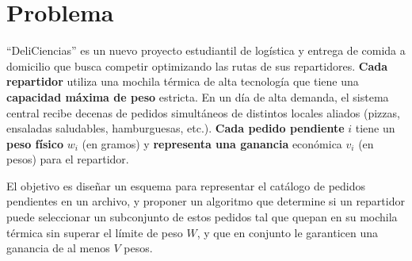 \section{Problema}

\begin{tcolorbox}[enunciado]

``DeliCiencias'' es un nuevo proyecto estudiantil de logística y entrega de comida a domicilio que busca competir optimizando las rutas de sus repartidores. \textbf{Cada repartidor} utiliza una mochila térmica de alta tecnología que tiene una \textbf{capacidad máxima de peso} estricta. En un día de alta demanda, el sistema central recibe decenas de pedidos simultáneos de distintos locales aliados (pizzas, ensaladas saludables, hamburguesas, etc.). \textbf{Cada pedido pendiente} $i$ tiene un \textbf{peso físico} $w_{i}$ (en gramos) y \textbf{representa una ganancia} económica $v_{i}$ (en pesos) para el repartidor.

El objetivo es diseñar un esquema para representar el catálogo de pedidos pendientes en un archivo, y proponer un algoritmo que determine si un repartidor puede seleccionar un subconjunto de estos pedidos tal que quepan en su mochila térmica sin superar el límite de peso $W$, y que en conjunto le garanticen una ganancia de al menos $V$ pesos.

\end{tcolorbox}